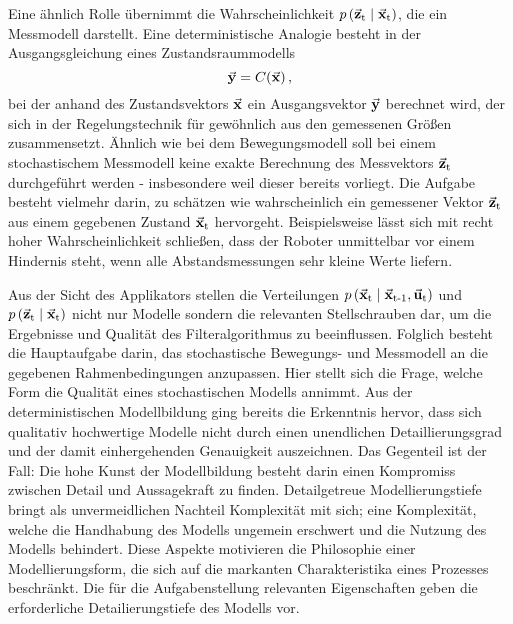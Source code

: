 Eine ähnlich Rolle übernimmt die Wahrscheinlichkeit $p\left({\vec{\mathbf{z}}_{\text{t}}} \hspace{1mm} \vert \hspace{1mm} {\vec{\mathbf{x}}_{\text{t}}}\right)$, die ein Messmodell darstellt. Eine deterministische Analogie besteht in der Ausgangsgleichung eines Zustandsraummodells
\begin{equation}
\vec{\mathbf{y}} = C(\vec{\mathbf{x}})\,,
\end{equation}
bei der anhand des Zustandsvektors $\vec{\mathbf{x}}$ ein Ausgangsvektor $\vec{\mathbf{y}}$ berechnet wird, der sich in der Regelungstechnik für gewöhnlich aus den gemessenen Größen zusammensetzt. Ähnlich wie bei dem Bewegungsmodell soll bei einem stochastischem Messmodell keine exakte Berechnung des Messvektors $\vec{\mathbf{z}}_{\text{t}}$ durchgeführt werden - insbesondere weil dieser bereits vorliegt. Die Aufgabe besteht vielmehr darin, zu schätzen wie wahrscheinlich ein gemessener Vektor $\vec{\mathbf{z}}_{\text{t}}$ aus einem gegebenen Zustand $\vec{\mathbf{x}}_{\text{t}}$ hervorgeht. Beispielsweise lässt sich mit recht hoher Wahrscheinlichkeit schließen, dass der Roboter unmittelbar vor einem Hindernis steht, wenn alle Abstandsmessungen sehr kleine Werte liefern.

Aus der Sicht des Applikators stellen die Verteilungen $p\left({\vec{\mathbf{x}}_{\text{t}}} \hspace{1mm} \vert \hspace{1mm} {\vec{\mathbf{x}}_{\text{t-1}},\vec{\mathbf{u}}_{\text{t}}}\right)$ und $p\left({\vec{\mathbf{z}}_{\text{t}}} \hspace{1mm} \vert \hspace{1mm} {\vec{\mathbf{x}}_{\text{t}}}\right)$ nicht nur Modelle sondern die relevanten Stellschrauben dar, um die Ergebnisse und Qualität des Filteralgorithmus zu beeinflussen. Folglich besteht die Hauptaufgabe darin, das stochastische Bewegungs- und Messmodell an die gegebenen Rahmenbedingungen anzupassen. Hier stellt sich die Frage, welche Form die Qualität eines stochastischen Modells annimmt. Aus der deterministischen Modellbildung ging bereits die Erkenntnis hervor, dass sich qualitativ hochwertige Modelle nicht durch einen unendlichen Detaillierungsgrad und der damit einhergehenden Genauigkeit auszeichnen. Das Gegenteil ist der Fall: Die hohe Kunst der Modellbildung besteht darin einen Kompromiss zwischen Detail und Aussagekraft zu finden. Detailgetreue Modellierungstiefe bringt als unvermeidlichen Nachteil Komplexität mit sich; eine Komplexität, welche die Handhabung des Modells ungemein erschwert und die Nutzung des Modells behindert. Diese Aspekte motivieren die Philosophie einer Modellierungsform, die sich auf die markanten Charakteristika eines Prozesses beschränkt. Die für die Aufgabenstellung relevanten Eigenschaften geben die erforderliche Detailierungstiefe des Modells vor. 

